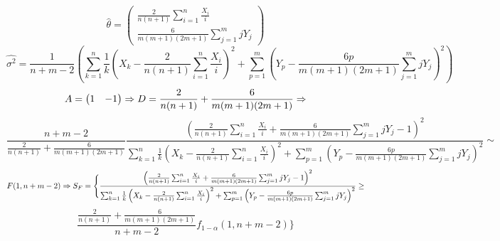 {{  \[
  \hat{\theta} = 
  \begin{pmatrix}
  \frac{2}{n(n+1)} \sum_{i = 1}^n \frac{X_i}{i} \\
  \frac{6}{m(m+1)(2m + 1)} \sum_{j = 1}^m jY_j
  \end{pmatrix}
  \]
    \[
  \hat{\sigma^2} = \frac{1}{n + m - 2}\left(\sum_{k = 1}^n \frac{1}{k}\left(X_k - \frac{2}{n(n + 1)}\sum_{i = 1}^n \frac{X_i}{i}\right)^2 + \sum_{p = 1}^m \left(Y_p - \frac{6p}{m(m + 1)(2m + 1)}\sum_{j = 1}^m jY_j\right)^2 \right)
  \]
  \[
  A = \begin{pmatrix} 1 & -1 \end{pmatrix}
  \Rightarrow D = \frac{2}{n(n+1)} + \frac{6}{m(m+1)(2m + 1)} \Rightarrow \]
  \[  \frac{n + m - 2}{\frac{2}{n(n+1)} + \frac{6}{m(m+1)(2m + 1)}} \frac{\left(\frac{2}{n(n+1)} \sum_{i = 1}^n \frac{X_i}{i} + \frac{6}{m(m+1)(2m + 1)} \sum_{j = 1}^m jY_j - 1\right)^2}{\sum_{k = 1}^n \frac{1}{k}\left(X_k - \frac{2}{n(n + 1)}\sum_{i = 1}^n \frac{X_i}{i}\right)^2 + \sum_{p = 1}^m \left(Y_p - \frac{6p}{m(m + 1)(2m + 1)}\sum_{j = 1}^m jY_j\right)^2} \sim \] \[F(1, n + m -2) \Rightarrow
  S_F = \Biggl\{\frac{\left(\frac{2}{n(n+1)} \sum_{i = 1}^n \frac{X_i}{i} + \frac{6}{m(m+1)(2m + 1)} \sum_{j = 1}^m jY_j - 1\right)^2}{\sum_{k = 1}^n \frac{1}{k}\left(X_k - \frac{2}{n(n + 1)}\sum_{i = 1}^n \frac{X_i}{i}\right)^2 + \sum_{p = 1}^m \left(Y_p - \frac{6p}{m(m + 1)(2m + 1)}\sum_{j = 1}^m jY_j\right)^2}  \ge \] \[ \frac{\frac{2}{n(n+1)} + \frac{6}{m(m+1)(2m + 1)}}{n + m - 2}f_{1 - \alpha}(1, n + m - 2)\Biggr\}
  \]
  }
  }
